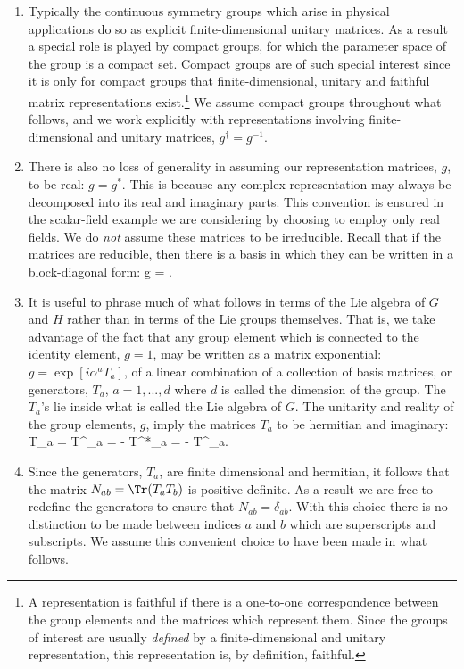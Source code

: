 \documentclass[12pt,epsf]{report}
\begin{document}
\begin{enumerate}

\item
Typically the continuous symmetry groups which arise in
physical applications do so as explicit finite-dimensional
unitary matrices. As a result a special role is played by
compact groups, for which the parameter space of the group
is a compact set. Compact groups are of such special
interest since it is only for compact groups that
finite-dimensional, unitary and faithful matrix
representations exist.\footnote{A representation is
faithful if there is a one-to-one correspondence between
the group elements and the matrices which represent them.
Since the groups of interest are usually {\em defined} by a
finite-dimensional and unitary representation, this
representation is, by definition, faithful.} We assume
compact groups throughout what follows, and we work
explicitly with representations involving
finite-dimensional and unitary matrices, $g^\dagger =
g^{-1}$.

\item
There is also no loss of generality in assuming our
representation matrices, $g$, to be real: $g = g^*$. This
is because any complex representation may always be
decomposed into its real and imaginary parts. This
convention is ensured in the scalar-field example we are
considering by choosing to employ only real fields. We do
{\em not} assume these matrices to be irreducible. 
Recall that if the matrices are reducible, then 
there is a basis in which they can be written in a 
block-diagonal form:
%
\eq
\label{reducibledef}
g = . 
\eeq

\item
It is useful to phrase much of what follows in terms of the
Lie algebra of $G$ and $H$ rather than in terms of the Lie
groups themselves. That is, we take advantage of the fact
that any group element which is connected to the identity
element, $g = 1$, may be written as a matrix exponential:
$g = \exp \left[ i \alpha^a T_a 
\right]$, of a linear combination of a collection of basis
matrices, or generators, $T_a$, $a = 1,...,d$ where $d$ is
called the dimension of the group. The $T_a$'s lie inside
what is called the Lie algebra of $G$. The unitarity and
reality of the group elements, $g$, imply the matrices
$T_a$ to be hermitian and imaginary:
%
\eq
\label{whatthetssatisfy}
T_a = T^\dagger_a = - T^*_a = - T^\sst_a. \eeq

\item
Since the generators, $T_a$, are finite dimensional and
hermitian, it follows that the matrix $N_{ab} = \Tr(T_a
T_b)$ is positive definite. As a result we are free to
redefine the generators to ensure that $N_{ab} =
\delta_{ab}$. With this choice there is no distinction to
be made between indices $a$ and $b$ which are superscripts
and subscripts. We assume this convenient choice to have
been made in what follows.


\end{enumerate}
\end{document}
